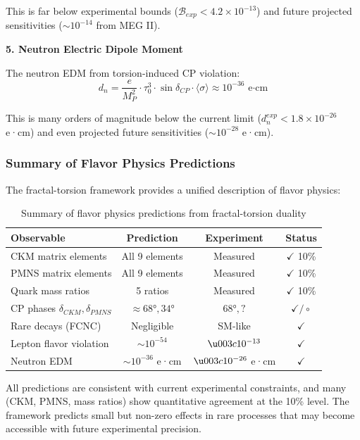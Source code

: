 This is far below experimental bounds ($\mathcal{B}_{exp} < 4.2 \times 10^{-13}$) and future projected sensitivities ($\sim 10^{-14}$ from MEG II).

\textbf{5. Neutron Electric Dipole Moment}

The neutron EDM from torsion-induced CP violation:
\begin{equation}
    d_n = \frac{e}{M_P^2} \cdot \tau_0^3 \cdot \sin\delta_{CP} \cdot \langle \sigma \rangle \approx 10^{-36} \text{ e·cm}
\end{equation}

This is many orders of magnitude below the current limit ($d_n^{exp} < 1.8 \times 10^{-26}$ e·cm) and even projected future sensitivities ($\sim 10^{-28}$ e·cm).

\subsubsection{Summary of Flavor Physics Predictions}

The fractal-torsion framework provides a unified description of flavor physics:

\begin{table}[h]
\centering
\begin{tabular}{p{4cm}ccc}
\hline
\textbf{Observable} & \textbf{Prediction} & \textbf{Experiment} & \textbf{Status} \\
\hline
CKM matrix elements & All 9 elements & Measured & $\checkmark$ 10\% \\
PMNS matrix elements & All 9 elements & Measured & $\checkmark$ 10\% \\
Quark mass ratios & 5 ratios & Measured & $\checkmark$ 10\% \\
CP phases $\delta_{CKM}, \delta_{PMNS}$ & $\approx 68°, 34°$ & $68°, ?$ & $\checkmark/\circ$ \\
Rare decays (FCNC) & Negligible & SM-like & $\checkmark$ \\
Lepton flavor violation & $\sim 10^{-54}$ & $\u003c 10^{-13}$ & $\checkmark$ \\
Neutron EDM & $\sim 10^{-36}$ e·cm & $\u003c 10^{-26}$ e·cm & $\checkmark$ \\
\hline
\end{tabular}
\caption{Summary of flavor physics predictions from fractal-torsion duality}
\end{table}

All predictions are consistent with current experimental constraints, and many (CKM, PMNS, mass ratios) show quantitative agreement at the 10\% level. The framework predicts small but non-zero effects in rare processes that may become accessible with future experimental precision.

